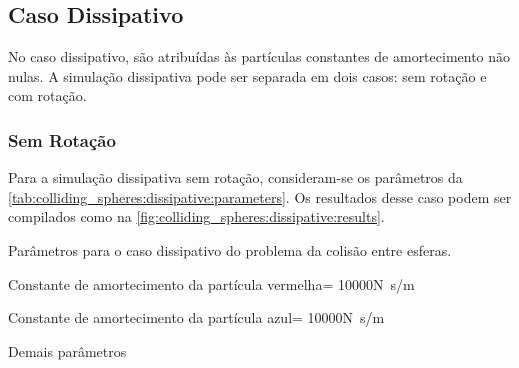 \subsection{Caso Dissipativo} \label{sec:colliding_spheres:dissipative}

No caso dissipativo, são atribuídas às partículas constantes de amortecimento não nulas. A simulação dissipativa pode ser separada em dois casos: sem rotação e com rotação.

\subsubsection{Sem Rotação}

Para a simulação dissipativa sem rotação, consideram-se os parâmetros da \cref{tab:colliding_spheres:dissipative:parameters}. Os resultados desse caso podem ser compilados como na \cref{fig:colliding_spheres:dissipative:results}.

\begin{table}[h]
\centering
\caption{Parâmetros para o caso dissipativo do problema da colisão entre esferas.}
\label{tab:colliding_spheres:dissipative:parameters}
\begin{parametersdesc}
	\item{Constante de amortecimento da partícula vermelha}{\redNormalDampingConstant = 10000}{\si[per-mode=symbol]{\newton\second\per\meter}}
	\item{Constante de amortecimento da partícula azul}{\blueNormalDampingConstant = 10000}{\si[per-mode=symbol]{\newton\second\per\meter}}
	\item{Demais parâmetros}{}{}
\end{parametersdesc}
\sourceMe 
\end{table}

